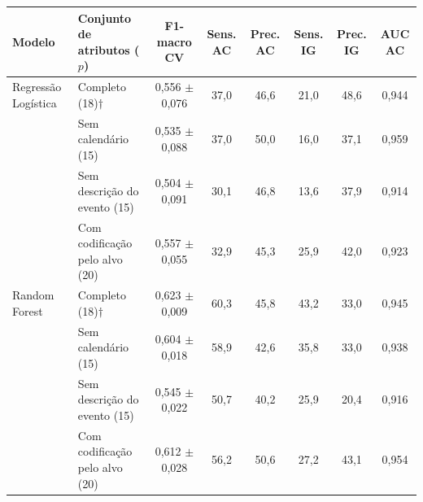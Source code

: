 \begin{tabular}{llcccccc}
\toprule
\textbf{Modelo} & \textbf{Conjunto de atributos ($p$)} & \textbf{F1-macro CV} & \textbf{Sens. AC} & \textbf{Prec. AC} & \textbf{Sens. IG} & \textbf{Prec. IG} & \textbf{AUC AC} \\
\midrule
Regressão Logística & Completo (18)$\dagger$ & 0,556 $\pm$ 0,076 & 37,0 & 46,6 & 21,0 & 48,6 & 0,944 \\
 & Sem calendário (15) & 0,535 $\pm$ 0,088 & 37,0 & 50,0 & 16,0 & 37,1 & 0,959 \\
 & Sem descrição do evento (15) & 0,504 $\pm$ 0,091 & 30,1 & 46,8 & 13,6 & 37,9 & 0,914 \\
 & Com codificação pelo alvo (20) & 0,557 $\pm$ 0,055 & 32,9 & 45,3 & 25,9 & 42,0 & 0,923 \\
\midrule
Random Forest & Completo (18)$\dagger$ & 0,623 $\pm$ 0,009 & 60,3 & 45,8 & 43,2 & 33,0 & 0,945 \\
 & Sem calendário (15) & 0,604 $\pm$ 0,018 & 58,9 & 42,6 & 35,8 & 33,0 & 0,938 \\
 & Sem descrição do evento (15) & 0,545 $\pm$ 0,022 & 50,7 & 40,2 & 25,9 & 20,4 & 0,916 \\
 & Com codificação pelo alvo (20) & 0,612 $\pm$ 0,028 & 56,2 & 50,6 & 27,2 & 43,1 & 0,954 \\
\bottomrule
\end{tabular}
